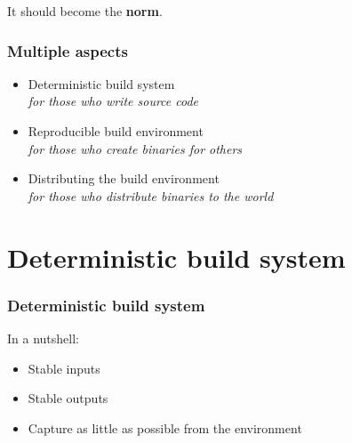 \documentclass[14pt,aspectratio=169]{beamer}
\begin{document}
\begin{frame}[plain]
\begin{center}
\Huge It should become the \textbf{norm}.
\end{center}
\end{frame}

\begin{frame}
\frametitle{Multiple aspects}

\begin{itemize}
\item Deterministic build system \\
  \textit{\small for those who write source code}
\item Reproducible build environment \\
  \textit{\small for those who create binaries for others}
\item Distributing the build environment \\
  \textit{\small for those who distribute binaries to the world}
\end{itemize}

\end{frame}

\section{Deterministic build system}

\begin{frame}
\frametitle{Deterministic build system}

In a nutshell:

\begin{itemize}
\item Stable inputs
\item Stable outputs
\item Capture as little as possible from the environment
\end{itemize}
\end{frame}
\end{document}
